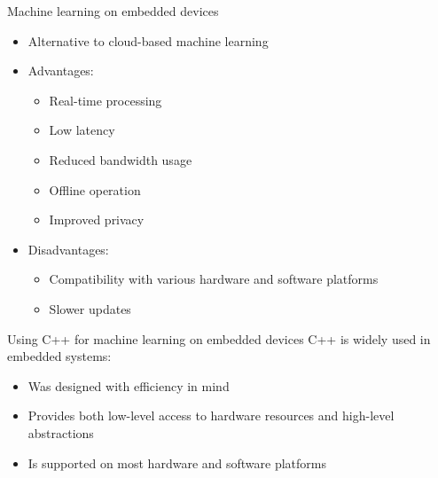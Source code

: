 \begin{frame}{Machine learning on embedded devices}
  \begin{itemize}
	\item Alternative to cloud-based machine learning
	\item Advantages:
	  \begin{itemize}
		\item Real-time processing
		\item Low latency
		\item Reduced bandwidth usage
		\item Offline operation
		\item Improved privacy
	  \end{itemize}
	\item Disadvantages:
	  \begin{itemize}
		\item Compatibility with various hardware and software platforms
		\item Slower updates
	  \end{itemize}
  \end{itemize}
\end{frame}

\begin{frame}{Using C++ for machine learning on embedded devices}
C++ is widely used in embedded systems:
  \begin{itemize}
	\item Was designed with efficiency in mind
	\item Provides both low-level access to hardware resources and high-level
	abstractions
	\item Is supported on most hardware and software platforms
  \end{itemize}
\end{frame}

